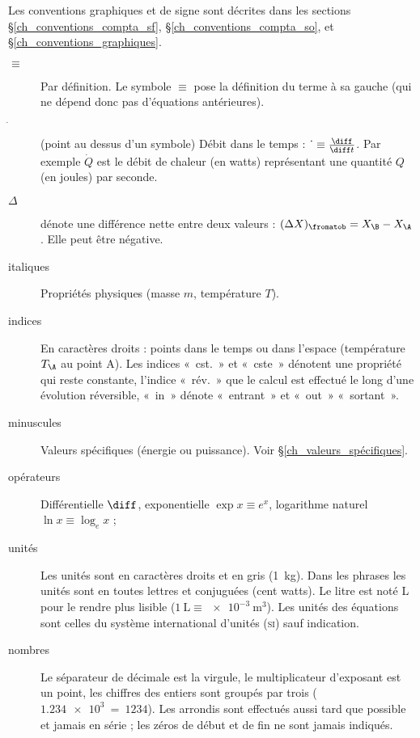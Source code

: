 
\TabPositions{2cm}

Les conventions graphiques et de signe sont décrites dans les sections \S\ref{ch_conventions_compta_sf}, \S\ref{ch_conventions_compta_so}, et \S\ref{ch_conventions_graphiques}.

\begin{description}
	\item[$\equiv$] 	\tab Par définition. Le symbole $\equiv$ pose la définition du terme à sa gauche (qui ne dépend donc pas d’équations antérieures).
	\item[$\dot~$]		\tab (point au dessus d’un symbole) Débit dans le temps : $\dot~ \equiv \frac{\diff}{\diff t}$. Par exemple $\dot Q$ est le débit de chaleur (en \si{watts}) représentant une quantité $Q$ (en \si{joules}) par \si{seconde}.
	\item[$\Delta$]	\tab dénote une différence nette entre deux valeurs : $(\Delta X)_\fromatob = X_\B - X_\A$. Elle peut être négative.
	\item[italiques] 	Propriétés physiques (masse $m$, température $T$).
	\item[indices]		En caractères droits : points dans le temps ou dans l’espace (température $T_\A$ au point A). Les indices «~cst.~» et «~cste~» dénotent une propriété qui reste constante, l’indice «~rév.~» que le calcul est effectué le long d’une évolution réversible, «~in~» dénote «~entrant~» et «~out~» «~sortant~».
	\item[minuscules]	Valeurs spécifiques (énergie ou puissance). Voir \S\ref{ch_valeurs_spécifiques}.
	\item[opérateurs]	Différentielle $\diff$, exponentielle $\exp x \equiv e^x $, logarithme naturel $\ln x \equiv \log_e x$ ;
	\item[unités]		Les unités sont en caractères droits et en gris (\SI{1}{\kilogram}). Dans les phrases les unités sont en toutes lettres et conjuguées (cent \si{watts}). Le \si{litre} est noté \si{\liter} pour le rendre plus lisible ($\SI{1}{\liter} \equiv \SI{e-3}{\metre\cubed}$). Les unités des équations sont celles du système international d’unités (\textsc{si}) sauf indication.
	\item[nombres]		Le séparateur de décimale est la virgule, le multiplicateur d’exposant est un point, les chiffres des entiers sont groupés par trois ($\SI{1,234e3} ~=~ \num{1234}$). Les arrondis sont effectués aussi tard que possible et jamais en série ; les zéros de début et de fin ne sont jamais indiqués.
\end{description}

